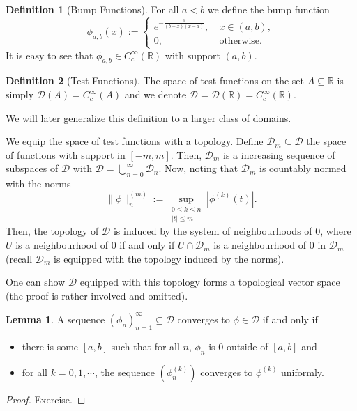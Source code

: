 \documentclass[]{article}
\theoremstyle{definition}
\theoremstyle{definition}
\newtheorem{definition}{Definition}[section]
\newtheorem{lemma}{Lemma}[section]
\begin{document}
\begin{definition}[Bump Functions]
  For all \(a < b\) we define the bump function 
  \[\phi_{a, b}(x) := \begin{cases}
    e^{-\frac{1}{(b - x)(x - a)}},\ & x \in (a, b),\\
    0,\ & \text{otherwise}.
  \end{cases}\]
  It is easy to see that \(\phi_{a, b} \in C_c^\infty(\mathbb{R})\) with 
  support \((a, b)\). 
\end{definition}

\begin{definition}[Test Functions]
  The space of test functions on the set \(A \subseteq \mathbb{R}\) is simply 
  \(\mathcal{D}(A) = C_c^\infty(A)\) and we denote 
  \(\mathcal{D} = \mathcal{D}(\mathbb{R}) = C_c^\infty(\mathbb{R})\).

  We will later generalize this definition to a larger class of domains. 
\end{definition}

We equip the space of test functions with a topology. Define 
\(\mathcal{D}_m \subseteq \mathcal{D}\) the space of functions with 
support in \([-m, m]\). Then, \(\mathcal{D}_m\) is a increasing sequence of 
subspaces of \(\mathcal{D}\) with \(\mathcal{D} = \bigcup_{n = 0}^\infty \mathcal{D}_n\).
Now, noting that \(\mathcal{D}_m\) is countably normed with the norms 
\[\|\phi\|_n^{(m)} := \sup_{\substack{0 \le k \le n\\ |t| \le m}} |\phi^{(k)}(t)|.\]
Then, the topology of \(\mathcal{D}\) is induced by the system of neighbourhoods 
of 0, where \(U\) is a neighbourhood of 0 if and only if \(U \cap \mathcal{D}_m\) 
is a neighbourhood of 0 in \(\mathcal{D}_m\) (recall \(\mathcal{D}_m\) is equipped 
with the topology induced by the norms). 

One can show \(\mathcal{D}\) equipped with this topology forms a topological 
vector space (the proof is rather involved and omitted).

\begin{lemma}
  A sequence \((\phi_n)_{n = 1}^\infty \subseteq \mathcal{D}\) converges to 
  \(\phi \in \mathcal{D}\) if and only if 
  \begin{itemize}
    \item there is some \([a, b]\) such that for all \(n\), \(\phi_n\) is 0 
      outside of \([a, b]\) and 
    \item for all \(k = 0, 1, \cdots\), the sequence \((\phi_n^{(k)})\) 
      converges to \(\phi^{(k)}\) uniformly.
  \end{itemize} 
\end{lemma}
\begin{proof}
  Exercise.
\end{proof}
\end{document}

